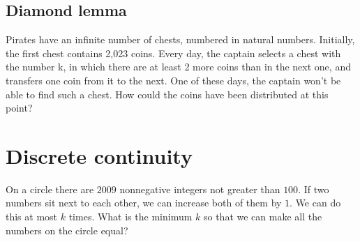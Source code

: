 \subsection{Diamond lemma}
\begin{example}
Pirates have an infinite number of chests, numbered in natural numbers. Initially, the first chest contains 2,023 coins. Every day, the captain selects a chest with the number k, in which there are at least 2 more coins than in the next one, and transfers one coin from it to the next. One of these days, the captain won't be able to find such a chest. How could the coins have been distributed at this point?
\end{example}
\section{Discrete continuity}
\begin{example}[Russia 2009]
On a circle there are $2009$ nonnegative integers not greater than $100$. If two numbers sit next to each other, we can increase both of them by $1$. We can do this at most $ k$ times. What is the minimum $ k$ so that we can make all the numbers on the circle equal?
\end{example}
